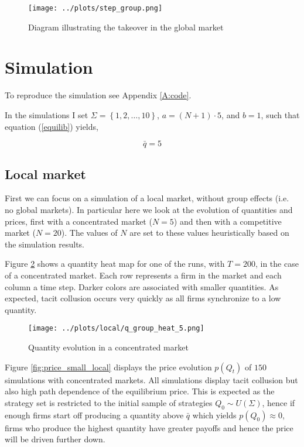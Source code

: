 \documentclass[american]{scrartcl}
\newcommand{\set}[1]{\left\{#1\right\}}
\begin{document}
\begin{center}
    \begin{figure}[H]
        \center
        \texttt{[image: ../plots/step\_group.png]}
        \caption{Diagram illustrating the takeover in the global market}
        \label{fig:diagram}
    \end{figure}
\end{center}


\section{Simulation}

To reproduce the simulation see Appendix \ref{A:code}.

In the simulations I set $\Sigma = \set{1, 2, \ldots, 10}$, $a = (N + 1) \cdot 5$, and $b = 1$, such that equation (\ref{equilib}) yields,

\begin{equation}
    \bar{q} = 5
\end{equation}

\subsection{Local market}

First we can focus on a simulation of a local market, without group effects (i.e. no global markets). In particular here we look at the evolution of quantities and prices, first with a concentrated market ($N = 5$) and then with a competitive market ($N = 20$). The values of $N$ are set to these values heuristically based on the simulation results.

Figure \ref{fig:small_local} shows a quantity heat map for one of the runs, with $T = 200$, in the case of a concentrated market. Each row represents a firm in the market and each column a time step. Darker colors are associated with smaller quantities. As expected, tacit collusion occurs very quickly as all firms synchronize to a low quantity.

\begin{center}
    \begin{figure}[H]
        \center
        \texttt{[image: ../plots/local/q\_group\_heat\_5.png]}
        \caption{Quantity evolution in a concentrated market}
        \label{fig:small_local}
    \end{figure}
\end{center}

Figure \ref{fig:price_small_local} displays the price evolution $p(Q_t)$ of $150$ simulations with concentrated markets. All simulations display tacit collusion but also high path dependence of the equilibrium price. This is expected as the strategy set is restricted to the initial sample of strategies $Q_0 \sim U(\Sigma)$, hence if enough firms start off producing a quantity above $\bar{q}$ which yields $p(Q_0) \approx 0$, firms who produce the highest quantity have greater payoffs and hence the price will be driven further down.
\end{document}
